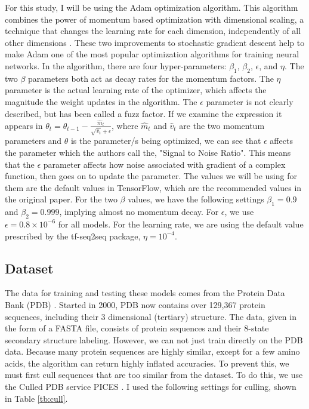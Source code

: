 \documentclass[pageno]{jpaper}
\begin{document}
\par
For this study, I will be using the Adam optimization algorithm.  This algorithm combines the power of momentum based optimization with dimensional scaling, a technique that changes the learning rate for each dimension, independently of all other dimensions \cite{kingma:2014}.  These two improvements to stochastic gradient descent help to make Adam one of the most popular optimization algorithms for training neural networks.  In the algorithm, there are four hyper-parameters: $\beta_{1}$, $\beta_{2}$, $\epsilon$, and $\eta$.  The two $\beta$ parameters both act as decay rates for the momentum factors.  The $\eta$ parameter is the actual learning rate of the optimizer, which affects the magnitude the weight updates in the algorithm.  The $\epsilon$ parameter is not clearly described, but has been called a fuzz factor.  If we examine the expression it appears in $\theta_{t} = \theta_{t - 1} - \frac{\hat{m}_{t}}{\sqrt{\hat{v}_{t}} + \epsilon}$, where $\hat{m}_{t}$ and $\hat{v}_{t}$ are the two momentum parameters and $\theta$ is the parameter/s being optimized, we can see that $\epsilon$ affects the parameter which the authors call the, "Signal to Noise Ratio".  This means that the $\epsilon$ parameter affects how noise associated with gradient of a complex function, then goes on to update the parameter.  The values we will be using for them are the default values in TensorFlow, which are the recommended values in the original paper.  For the two $\beta$ values, we have the following settings $\beta_{1} = 0.9$ and $\beta_{2} = 0.999$, implying almost no momentum decay.  For $\epsilon$, we use $\epsilon = 0.8 \times 10^{-6}$ for all models.  For the learning rate, we are using the default value prescribed by the tf-seq2seq package, $\eta = 10^{-4}$.


\subsection{Dataset}
The data for training and testing these models comes from the Protein Data Bank (PDB) \cite{berman:2000}.  Started in 2000, PDB now contains over 129,367 protein sequences, including their 3 dimensional (tertiary) structure.  The data, given in the form of a FASTA file, consists of protein sequences and their 8-state secondary structure labeling.  However, we can not just train directly on the PDB data.  Because many protein sequences are highly similar, except for a few amino acids, the algorithm can return highly inflated accuracies.  To prevent this, we must first cull sequences that are too similar from the dataset.  To do this, we use the Culled PDB service PICES \cite{dunbrack:2005}.  I used the following settings for culling, shown in Table \ref{tb:cull}.
\end{document}
